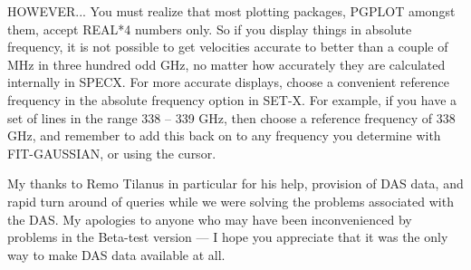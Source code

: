 \documentclass[twoside,11pt,nolof]{starlink}
\begin{document}
HOWEVER... You must realize that most plotting packages, PGPLOT
amongst them, accept REAL*4 numbers only. So if you display things in
absolute frequency, it is not possible to get velocities accurate to
better than a couple of MHz in three hundred odd GHz, no matter how
accurately they are calculated internally in SPECX. For more accurate
displays, choose a convenient reference frequency in the absolute
frequency option in SET-X. For  example, if you have a set of lines
in the range 338 -- 339 GHz, then choose a reference frequency of
338 GHz, and remember to add this back on to any frequency you determine
with FIT-GAUSSIAN, or using the cursor.

My thanks to Remo Tilanus in particular for his help,
provision of DAS data, and rapid turn around of queries while we
were solving the problems associated with the DAS. My apologies to
anyone who may have been inconvenienced by problems in the Beta-test
version --- I hope you appreciate that it was the only way to make
DAS data available at all.
\end{document}
